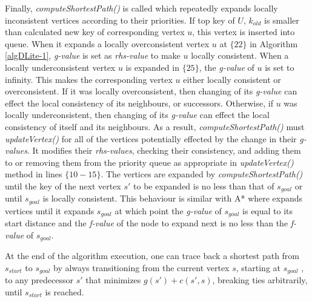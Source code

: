 Finally, \textit{computeShortestPath()} is called which repeatedly expands locally inconsistent vertices according to their priorities. If top key of $U$, $k_{old}$ is smaller than calculated new key of corresponding vertex $u$, this vertex is inserted into queue. When it expands a locally overconsistent vertex $u$ at $\lbrace 22 \rbrace$ in Algorithm \ref{algDLite-1}, \textit{g-value} is set as \textit{rhs-value} to make $u$ locally consistent. When a locally underconsistent vertex $u$ is expanded in $\lbrace 25 \rbrace$, the \textit{g-value} of $u$ is set to infinity. This makes the corresponding vertex $u$ either locally consistent or overconsistent. If it was locally overconsistent, then changing of its \textit{g-value} can effect the local consistency of its neighbours, or successors. Otherwise, if $u$ was locally underconsistent, then changing of its \textit{g-value} can effect the local consistency of itself and its neighbours. As a result, \textit{computeShortestPath()} must \textit{updateVertex()} for all of the vertices potentially effected by the change in their \textit{g-values}. It modifies their \textit{rhs-values}, checking their consistency, and adding them to or removing them from the priority queue as appropriate in \textit{updateVertex()} method in lines $\lbrace 10 - 15 \rbrace$. The vertices are expanded by \textit{computeShortestPath()} until the key of the next vertex $s'$ to be expanded is no less than that of $s_{goal}$ or until $s_{goal}$ is locally consistent. This behaviour is similar with A* where expands vertices until it expands $s_{goal}$ at which point the \textit{g-value} of $s_{goal}$ is equal to its start distance and the \textit{f-value} of the node to expand next is no less than the \textit{f-value} of $s_{goal}$.

At the end of the algorithm execution, one can trace back a shortest path from $s_{start}$ to $s_{goal}$ by always transitioning from the current vertex $s$, starting at $s_{goal}$ , to any predecessor $s'$ that minimizes $g(s') + c(s',s)$, breaking ties arbitrarily, until $s_{start}$ is reached.